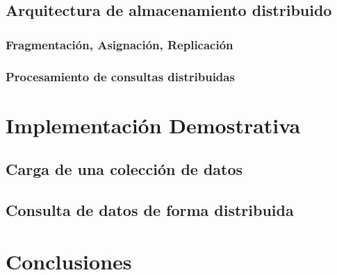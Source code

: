 \documentclass{article}
\begin{document}
        \subsection{Arquitectura de almacenamiento distribuido}
            \subsubsection{Fragmentación, Asignación, Replicación}
            \subsubsection{Procesamiento de consultas distribuidas}
    \section{Implementación Demostrativa}
        \subsection{Carga de una colección de datos}
        \subsection{Consulta de datos de forma distribuida}
    \section{Conclusiones}

    \newpage

    
    
\end{document}
